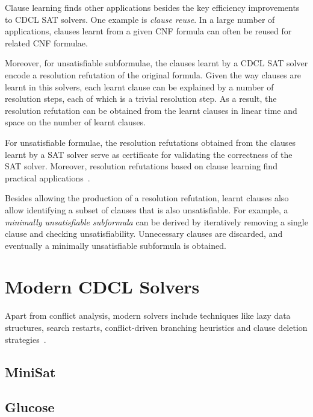 Clause learning finds other applications besides the key efficiency improvements
to CDCL SAT solvers. One example is \emph{clause reuse}. In a large number of
applications, clauses learnt from a given CNF formula can often be reused for
related CNF formulae. 

Moreover, for unsatisfiable subformulae, the clauses learnt by a CDCL SAT solver
encode a resolution refutation of the original formula. Given the way clauses
are learnt in this solvers, each learnt clause can be explained by a number of
resolution steps, each of which is a trivial resolution step. As a result, the
resolution refutation can be obtained from the learnt clauses in linear time and
space on the number of learnt clauses. 

For unsatisfiable formulae, the resolution refutations obtained from the clauses
learnt by a SAT solver serve as certificate for validating the correctness of
the SAT solver. Moreover, resolution refutations based on clause learning find
practical applications~\cite{cdclchapter}.

Besides allowing the production of a resolution refutation, learnt clauses also
allow identifying a subset of clauses that is also unsatisfiable. For example, a
\emph{minimally unsatisfiable subformula} can be derived by iteratively removing
a single clause and checking unsatisfiability. Unnecessary clauses are
discarded, and eventually a minimally unsatisfiable subformula is obtained.

\section{Modern CDCL Solvers}%

Apart from conflict analysis, modern solvers include techniques like lazy data
structures, search restarts, conflict-driven branching heuristics and clause
deletion strategies~\cite{cdclchapter}.  

\subsection{MiniSat}%
\label{sec:minisat}

\subsection{Glucose}
